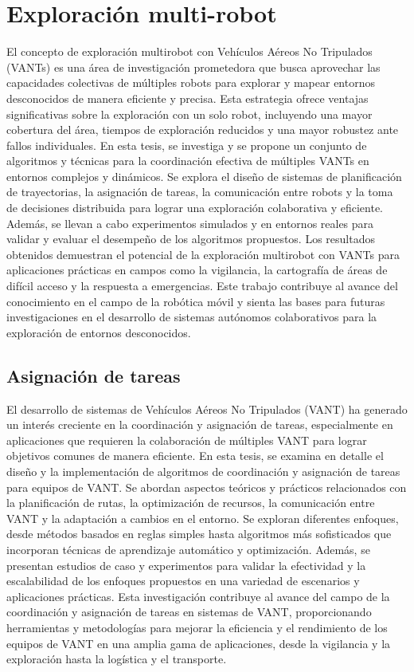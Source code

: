 \section{Exploración multi-robot}

El concepto de exploración multirobot con Vehículos Aéreos No Tripulados (VANTs) es una área de investigación prometedora que busca aprovechar las capacidades colectivas de múltiples robots para explorar y mapear entornos desconocidos de manera eficiente y precisa. Esta estrategia ofrece ventajas significativas sobre la exploración con un solo robot, incluyendo una mayor cobertura del área, tiempos de exploración reducidos y una mayor robustez ante fallos individuales. En esta tesis, se investiga y se propone un conjunto de algoritmos y técnicas para la coordinación efectiva de múltiples VANTs en entornos complejos y dinámicos. Se explora el diseño de sistemas de planificación de trayectorias, la asignación de tareas, la comunicación entre robots y la toma de decisiones distribuida para lograr una exploración colaborativa y eficiente. Además, se llevan a cabo experimentos simulados y en entornos reales para validar y evaluar el desempeño de los algoritmos propuestos. Los resultados obtenidos demuestran el potencial de la exploración multirobot con VANTs para aplicaciones prácticas en campos como la vigilancia, la cartografía de áreas de difícil acceso y la respuesta a emergencias. Este trabajo contribuye al avance del conocimiento en el campo de la robótica móvil y sienta las bases para futuras investigaciones en el desarrollo de sistemas autónomos colaborativos para la exploración de entornos desconocidos.

\subsection{Asignación de tareas}

El desarrollo de sistemas de Vehículos Aéreos No Tripulados (VANT) ha generado un interés creciente en la coordinación y asignación de tareas, especialmente en aplicaciones que requieren la colaboración de múltiples VANT para lograr objetivos comunes de manera eficiente. En esta tesis, se examina en detalle el diseño y la implementación de algoritmos de coordinación y asignación de tareas para equipos de VANT. Se abordan aspectos teóricos y prácticos relacionados con la planificación de rutas, la optimización de recursos, la comunicación entre VANT y la adaptación a cambios en el entorno. Se exploran diferentes enfoques, desde métodos basados en reglas simples hasta algoritmos más sofisticados que incorporan técnicas de aprendizaje automático y optimización. Además, se presentan estudios de caso y experimentos para validar la efectividad y la escalabilidad de los enfoques propuestos en una variedad de escenarios y aplicaciones prácticas. Esta investigación contribuye al avance del campo de la coordinación y asignación de tareas en sistemas de VANT, proporcionando herramientas y metodologías para mejorar la eficiencia y el rendimiento de los equipos de VANT en una amplia gama de aplicaciones, desde la vigilancia y la exploración hasta la logística y el transporte.

